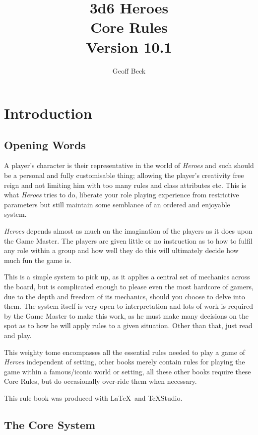 \documentclass[a4paper,10pt,oneside]{book}
\title{\textbf{\huge 3d6 Heroes \\Core Rules \\Version 10.1}}
\author{Geoff Beck}
\date{}
\begin{document}
\maketitle
\frontmatter
\tableofcontents
\mainmatter

\chapter{Introduction}

\section{Opening Words}
A player's character is their representative in the world of \textit{Heroes} and such should be a personal and fully customisable thing; allowing the player's creativity free reign and not limiting him with too many rules and class attributes etc. This is what \textit{Heroes} tries to do, liberate your role playing experience from restrictive parameters but still maintain some semblance of an ordered and enjoyable system.

\textit{Heroes} depends almost as much on the imagination of the players as it does upon the Game Master. The players are given little or no instruction as to how to fulfil any role within a group and how well they do this will ultimately decide how much fun the game is.

This is a simple system to pick up, as it applies a central set of mechanics across the board, but is complicated enough to please even the most hardcore of gamers, due to the depth and freedom of its mechanics, should you choose to delve into them. The system itself is very open to interpretation and lots of work is required by the Game Master to make this work, as he must make many decisions on the spot as to how he will apply rules to a given situation. Other than that, just read and play.

This weighty tome encompasses all the essential rules needed to play a game of \textit{Heroes} independent of setting, other books merely contain rules for playing the game within a famous/iconic world or setting, all these other books require these Core Rules, but do occasionally over-ride them when necessary.

This rule book was produced with \LaTeX $\,$ and \TeX Studio.

\section{The Core System}
\label{sec:base}
\end{document}
